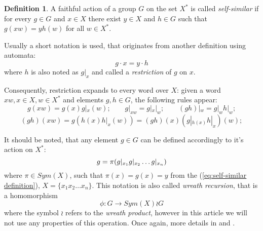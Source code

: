 \documentclass[a4paper,12pt]{amsart}
\theoremstyle{definition}
\newtheorem{definition}{Definition}
\begin{document}
	
	\begin{definition}
		A faithful action of a group $G$ on the set $X^{*}$ is called \textit{self-similar} if for every $g\in G$ and $x\in X$ there exist $y\in X$ and $h\in G$ such that
		$g(xw)=yh(w)$ for all $w\in X^{*}$.
		
		Usually a short notation is used, that originates from another definition using automata: 
		\begin{equation} \label{eq:self-similar definition}
			g \cdot x = y \cdot h	
		\end{equation}
		where $h$ is also noted as $g|_x$ and called a \textit{restriction} of $g$ on $x$.
	\end{definition}
	
	Consequently, restriction expands to every word over $X$: given a word $xw, x \in X, w \in X^*$ and elements $g, h \in G$, the following rules appear: 
	$$ 
	g(xw) = g(x) g|_x (w); \quad \quad g|_{xw} = g|_x|_w;  \quad \quad (gh)|_w = g|_w h|_w; 
	$$ 
	$$ 
	(gh)(xw) = g( h(x)h|_x(w) ) = (gh)(x) (g|_{h(x)}h|_x)(w); 
	$$
	
	
	It should be noted, that any element $g \in G$ can be defined accordingly to it's action on $X^*$: 
	$$
	g = \pi (g\arrowvert_{x_1} g\arrowvert_{x_2} \dots g\arrowvert_{x_n})
	$$
	where $\pi \in Sym(X)$, such that $\pi(x) = g(x) = y$ from the (\ref{eq:self-similar definition}), $X = \{x_1 x_2 \dots x_n\}$. This notation is also called \textit{wreath recursion}, that is a homomorphism 
	$$
	\phi : G \rightarrow Sym(X) \wr G
	$$
	where the symbol $\wr$ refers to the \textit{wreath product}, however in this article we will not use any properties of this operation. Once again, more details in \cite{Nekrashevych:self-similar} and \cite{GeomAlgebra:Bondarenko}.
	
	
	
\end{document}
